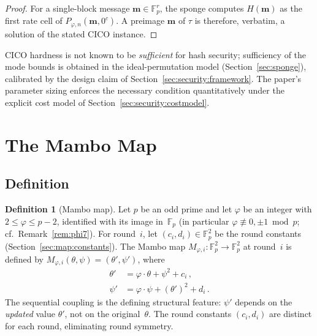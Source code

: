 \documentclass[11pt,a4paper]{article}
\theoremstyle{definition}
\newtheorem{definition}[theorem]{Definition}
\newcommand{\Fp}{\mathbb{F}_p}
\begin{document}
\begin{proof}
For a single-block message $\mathbf{m} \in \Fp^{r}$, the sponge
computes $H(\mathbf{m})$ as the first rate cell of
$P_{\varphi,n}(\mathbf{m}, 0^c)$. A preimage $\mathbf{m}$ of $\tau$
is therefore, verbatim, a solution of the stated CICO instance.
\end{proof}

CICO hardness is not known to be \emph{sufficient} for hash
security; sufficiency of the mode bounds is obtained in the
ideal-permutation model (Section~\ref{sec:sponge}), calibrated by the
design claim of Section~\ref{sec:security:framework}. The paper's
parameter sizing enforces the necessary condition quantitatively
under the explicit cost model of
Section~\ref{sec:security:costmodel}.


\section{The Mambo Map}\label{sec:map}

\subsection{Definition}\label{sec:map:def}

\begin{definition}[Mambo map]\label{def:mambo}
Let $p$ be an odd prime and let $\varphi$ be an integer with
$2 \le \varphi \le p - 2$, identified with its image in~$\Fp$ (in
particular $\varphi \not\equiv 0, \pm 1 \bmod p$; cf.\
Remark~\ref{rem:phi7}). For
round~$i$, let $(c_i, d_i) \in \Fp^2$ be the round constants
(Section~\ref{sec:map:constants}). The Mambo map
$M_{\varphi,i}\colon \Fp^2 \to \Fp^2$ at round~$i$ is defined by
$M_{\varphi,i}(\theta, \psi) = (\theta', \psi')$, where
\begin{align}
  \theta' &= \varphi\cdot\theta + \psi^2 + c_i\,,  \label{eq:theta} \\
  \psi'   &= \varphi\cdot\psi + (\theta')^2 + d_i\,.  \label{eq:psi}
\end{align}
The sequential coupling is the defining structural feature: $\psi'$ depends
on the \emph{updated} value $\theta'$, not on the original~$\theta$. The
round constants $(c_i, d_i)$ are distinct for each round, eliminating
round symmetry.
\end{definition}
\end{document}
